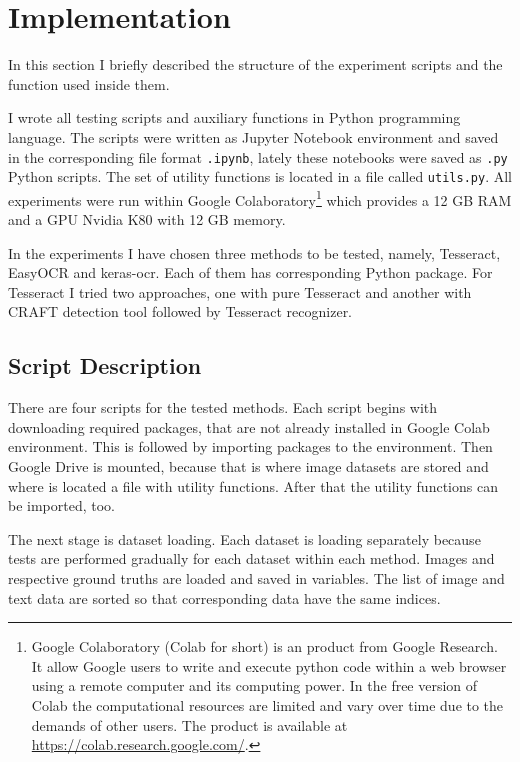 \section{Implementation}
\label{sec:implement}

In this section I briefly described the structure of the experiment scripts and the function used inside them.

I wrote all testing scripts and auxiliary functions in Python programming language. The scripts were written as Jupyter Notebook environment and saved in the corresponding file format \texttt{.ipynb}, lately these notebooks were saved as \texttt{.py} Python scripts. The set of utility functions is located in a file called \texttt{utils.py}. All experiments were run within Google Colaboratory\footnote{Google Colaboratory (Colab for short) is an product from Google Research. It allow Google users to write and execute python code within a web browser using a remote computer and its computing power. In the free version of Colab the computational resources are limited and vary over time due to the demands of other users. The product is available at \url{https://colab.research.google.com/}.} which provides a 12 GB RAM and a GPU Nvidia K80 with 12 GB memory.

In the experiments I have chosen three methods to be tested, namely, Tesseract, EasyOCR and keras-ocr. Each of them has corresponding Python package. For Tesseract I tried two approaches, one with pure Tesseract and another with CRAFT detection tool followed by Tesseract recognizer. 

\subsection{Script Description}

There are four scripts for the tested methods. Each script begins with downloading required packages, that are not already installed in Google Colab environment. This is followed by importing packages to the environment. Then Google Drive is mounted, because that is where image datasets are stored and where is located a file with utility functions. After that the utility functions can be imported, too.

The next stage is dataset loading. Each dataset is loading separately because tests are performed gradually for each dataset within each method. Images and respective ground truths are loaded and saved in variables. The list of image and text data are sorted so that corresponding data have the same indices.

